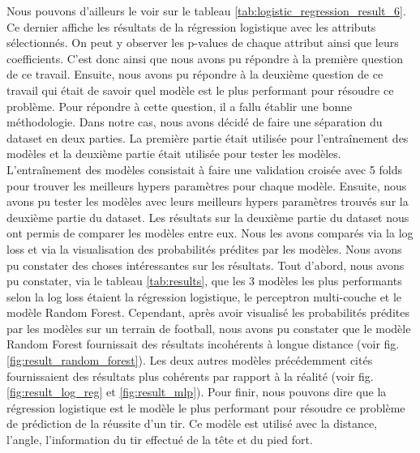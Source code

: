 \documentclass[12pt]{article}
\begin{document}
Nous pouvons d'ailleurs le voir sur le tableau \ref{tab:logistic_regression_result_6}.
Ce dernier affiche les résultats de la régression logistique avec les attributs sélectionnés.
On peut y observer les p-values de chaque attribut ainsi que leurs coefficients.
C'est donc ainsi que nous avons pu répondre à la première question de ce travail.
\newline\newline
Ensuite, nous avons pu répondre à la deuxième question de ce travail qui était de savoir quel modèle est le plus performant pour résoudre ce problème.
Pour répondre à cette question, il a fallu établir une bonne méthodologie.
\newline\newline
Dans notre cas, nous avons décidé de faire une séparation du dataset en deux parties.
La première partie était utilisée pour l'entraînement des modèles et la deuxième partie était utilisée pour tester les modèles.
L'entraînement des modèles consistait à faire une validation croisée avec 5 folds pour trouver les meilleurs hypers paramètres pour chaque modèle.
Ensuite, nous avons pu tester les modèles avec leurs meilleurs hypers paramètres trouvés sur la deuxième partie du dataset.
\newline\newline
Les résultats sur la deuxième partie du dataset nous ont permis de comparer les modèles entre eux.
Nous les avons comparés via la log loss et via la visualisation des probabilités prédites par les modèles.
Nous avons pu constater des choses intéressantes sur les résultats.
Tout d'abord, nous avons pu constater, via le tableau \ref{tab:results}, que les 3 modèles les plus performants selon la log loss étaient la régression logistique, le perceptron multi-couche et le modèle Random Forest.
Cependant, après avoir visualisé les probabilités prédites par les modèles sur un terrain de football, nous avons pu constater que le modèle Random Forest fournissait des résultats incohérents à longue distance (voir fig. \ref{fig:result_random_forest}).
Les deux autres modèles précédemment cités fournissaient des résultats plus cohérents par rapport à la réalité (voir fig. \ref{fig:result_log_reg} et \ref{fig:result_mlp}).
\newline\newline
Pour finir, nous pouvons dire que la régression logistique est le modèle le plus performant pour résoudre ce problème de prédiction de la réussite d'un tir.
Ce modèle est utilisé avec la distance, l'angle, l'information du tir effectué de la tête et du pied fort.
\newpage
\end{document}
